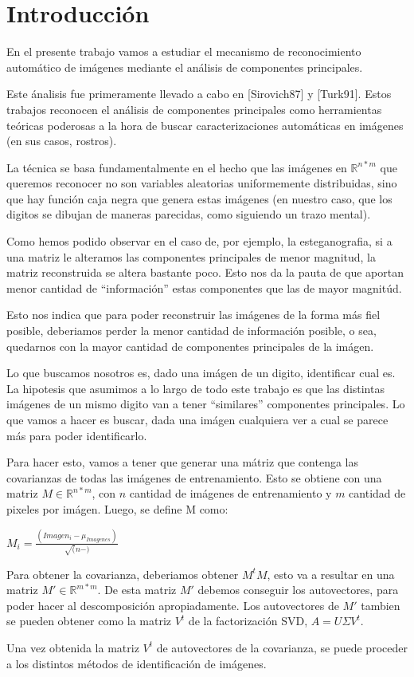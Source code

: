 \section{Introducci\'on}

En el presente trabajo vamos a estudiar el mecanismo de reconocimiento autom\'atico de 
im\'agenes mediante el an\'alisis de componentes principales. 

Este \'analisis fue primeramente llevado a cabo en [Sirovich87] y [Turk91]. Estos trabajos
reconocen el an\'alisis de componentes principales como herramientas te\'oricas poderosas
a la hora de buscar caracterizaciones autom\'aticas en im\'agenes (en  sus casos, rostros).

La t\'ecnica se basa fundamentalmente en el hecho que las im\'agenes en $\mathbb{R}^{n * m}$ que queremos reconocer
no son variables aleatorias uniformemente distribuidas, sino que hay funci\'on caja negra que genera
estas im\'agenes (en nuestro caso, que los digitos se dibujan de maneras parecidas, como siguiendo un trazo mental).

Como hemos podido observar en el caso de, por ejemplo, la esteganografia, si a una matriz le alteramos las
componentes principales de menor magnitud, la matriz reconstruida se altera bastante poco. Esto nos da
la pauta de que aportan menor cantidad de ``informaci\'on'' estas componentes que las de mayor magnit\'ud.

Esto nos indica que para poder reconstruir las im\'agenes de la forma m\'as fiel posible,
deberiamos perder la menor cantidad de informaci\'on posible, o sea, quedarnos con la mayor cantidad
de componentes principales de la im\'agen. 

Lo que buscamos nosotros es, dado una im\'agen de un digito, identificar cual es. La hipotesis
que asumimos a lo largo de todo este trabajo es que las distintas im\'agenes de un mismo digito van 
a tener ``similares'' componentes principales. Lo que vamos a hacer es buscar, dada una im\'agen cualquiera
ver a cual se parece m\'as para poder identificarlo.

Para hacer esto, vamos a tener que generar una m\'atriz que contenga las covarianzas de todas las
im\'agenes de entrenamiento. Esto se obtiene con una matriz $M \in \mathbb{R}^{n * m}$, con $n$ cantidad
de im\'agenes de entrenamiento y $m$ cantidad de pixeles por im\'agen. Luego, se define M como:

$M_i = \frac{(Imagen_i - \mu_{Imagenes})}{\sqrt(n-)}$

Para obtener la covarianza, deberiamos obtener $M^t M$, esto va a resultar en una matriz $M' \in \mathbb{R}^{m * m}$.
De esta matriz $M'$ debemos conseguir los autovectores, para poder hacer al descomposici\'on apropiadamente.
Los autovectores de $M'$ tambien se pueden obtener como la matriz $V^t$ de la factorizaci\'on SVD, $A=U\Sigma V^t$.

Una vez obtenida la matriz $V^t$ de autovectores de la covarianza, se puede proceder a los distintos m\'etodos de
identificaci\'on de im\'agenes.
